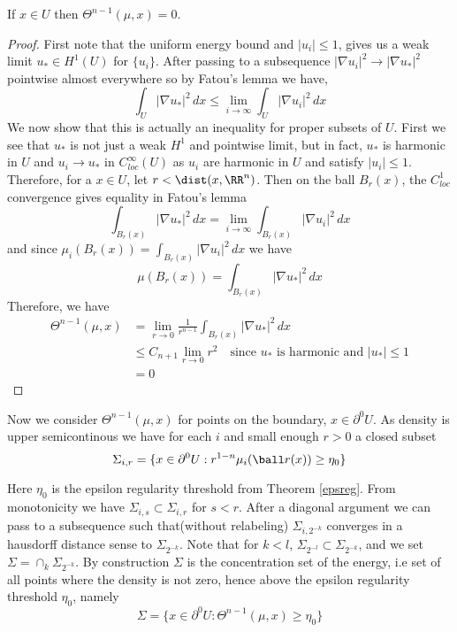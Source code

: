 \begin{prop} \label{lem0}
 If $x \in U$ then $\Theta^{n-1}(\mu,x)=0$.
\end{prop} 
\begin{proof}
    First note that the uniform energy bound and $|u_i| \leq 1$, gives us a weak limit $u_* \in H^1(U)$ for $\{u_i\}$. After passing to a subsequence $|\nabla u_i|^2 \to |\nabla u_*|^2$ pointwise almost everywhere so by Fatou's lemma we have,
    $$\int_U |\nabla u_*|^2 \,dx \leq \lim_{i \to \infty} \int_U |\nabla u_i|^2 \,dx$$
    We now show that this is actually an inequality for proper subsets of $U$. First we see that $u_*$ is not just a weak $H^1$ and pointwise limit, but in fact, $u_*$ is harmonic in $U$ and $u_i \to u_*$ in $C^{\infty}_{loc}(U)$ as $u_i$ are harmonic in $U$ and satisfy $|u_i| \leq 1$. Therefore, for a $x \in U$, let $r<\dist(x,\RR^n)$. Then on the ball $B_r(x)$, the $C^1_{loc}$ convergence gives equality in Fatou's lemma
    \begin{equation} \label{intconvu}
       \int_{B_r(x)} |\nabla u_*|^2 \,dx = \lim_{i \to \infty} \int_{B_r(x)} |\nabla u_i|^2 \,dx 
    \end{equation}
    and since $\mu_i(B_{r}(x)) = \int_{B_r(x)} |\nabla u_i|^2 \,dx$ we have 
    \begin{equation} \label{intmeasure}
        \mu(B_r(x)) = \int _{B_r(x)}|\nabla u_*|^2 \,dx
    \end{equation} 
    Therefore, we have
    \begin{align*}
        \Theta^{n-1}(\mu,x)&= \lim_{r \to 0}\frac{1}{r^{n-1}} \int_{B_r(x)} |\nabla u_*|^2 \,dx \\
        &\leq C_{n+1} \lim_{r\to0} r^{2} \quad \text{since }u_* \text{ is harmonic and }|u_*|\leq 1 \\
        &=0
    \end{align*}
\end{proof}

Now we consider $\Theta^{n-1}(\mu,x)$ for points on the boundary, $x \in \partial^0U$. As density is upper semicontinous we have for each $i$ and small enough $r>0$ a closed subset 
\begin{equation} \label{rel:concset0}
    \Sigma_{i,r} = \{x \in \partial^0U : r^{1-n} \mu_i(\ball r (x)) \geq \eta_0\}
\end{equation}

Here $\eta_0$ is the epsilon regularity threshold from Theorem \ref{epsreg}. From monotonicity we have $\Sigma_{i,s}\subset \Sigma_{i,r}$ for $s<r$. After a diagonal argument we can pass to a subsequence such that(without relabeling) $\Sigma_{i,2^{-k}}$ converges in a hausdorff distance sense to $\Sigma_{2^{-k}}$. Note that for $k<l$, $\Sigma_{2^{-l}} \subset \Sigma_{2^{-k}}$, and we set $\Sigma = \cap_{k} \Sigma_{2^{-k}}$. By construction $\Sigma$ is the concentration set of the energy, i.e set of all points where the density is not zero, hence above the epsilon regularity threshold $\eta_0$, namely 
\begin{equation} \label{rel:concset}
    \Sigma = \{x \in \partial^0 U : \Theta^{n-1}(\mu,x) \geq \eta_0 \}
\end{equation}  


